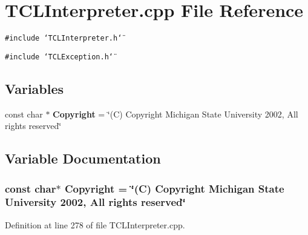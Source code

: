 \section{TCLInterpreter.cpp File Reference}
\label{TCLInterpreter_8cpp}
{\tt \#include \char`\"{}TCLInterpreter.h\char`\"{}}\par
{\tt \#include \char`\"{}TCLException.h\char`\"{}}\par
\subsection*{Variables}
\begin{CompactItemize}
\item 
const char $\ast$ {\bf Copyright} = \char`\"{}(C) Copyright Michigan State University 2002, All rights reserved\char`\"{}
\end{CompactItemize}


\subsection{Variable Documentation}
\subsubsection{\setlength{\rightskip}{0pt plus 5cm}const char$\ast$ Copyright = \char`\"{}(C) Copyright Michigan State University 2002, All rights reserved\char`\"{}\hspace{0.3cm}{\tt  [static]}}\label{TCLInterpreter_8cpp_a0}




Definition at line 278 of file TCLInterpreter.cpp.